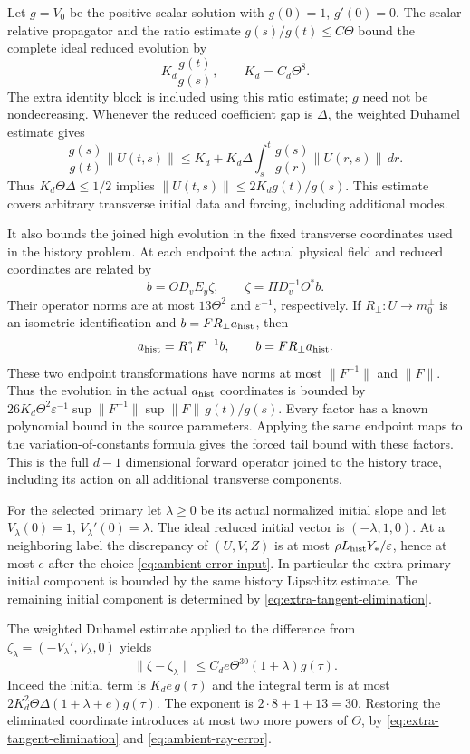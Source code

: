 \documentclass[11pt]{article}
\theoremstyle{definition}
\begin{document}
Let $g=V_0$ be the positive scalar solution with $g(0)=1$, $g'(0)=0$.
The scalar relative propagator and the ratio estimate
$g(s)/g(t)\leq C\Theta$ bound the complete ideal reduced evolution by
\[
 K_d\frac{g(t)}{g(s)},\qquad K_d=C_d\Theta^8 .
\]
The extra identity block is included using this ratio estimate;
$g$ need not be nondecreasing. Whenever the reduced
coefficient gap is $\Delta$, the weighted Duhamel estimate gives
\[
 \frac{g(s)}{g(t)}\|U(t,s)\|
 \leq K_d+K_d\Delta
       \int_s^t\frac{g(s)}{g(r)}\|U(r,s)\|\,dr .
\]
Thus $K_d\Theta\Delta\leq1/2$ implies
$\|U(t,s)\|\leq2K_dg(t)/g(s)$.
This estimate covers arbitrary transverse initial data and forcing,
including additional modes.

It also bounds the joined high evolution in the fixed transverse
coordinates used in the history problem. At each endpoint the actual
physical field and reduced coordinates are related by
\[
 b=O D_vE_y\zeta,\qquad
 \zeta=\Pi D_v^{-1}O^*b.
\]
Their operator norms are at most $13\Theta^2$ and
$\varepsilon^{-1}$, respectively. If $R_\perp:U\to m_0^\perp$
is an isometric identification and $b=F R_\perp a_{\rm hist}$, then
\[
 a_{\rm hist}=R_\perp^*F^{-1}b,\qquad
 b=F R_\perp a_{\rm hist}.
\]
These two endpoint transformations have norms at most $\|F^{-1}\|$ and $\|F\|$.
Thus the evolution in the actual $a_{\rm hist}$ coordinates is bounded
by $26K_d\Theta^2\varepsilon^{-1}
\sup\|F^{-1}\|\sup\|F\|\,g(t)/g(s)$.
Every factor has a known polynomial bound in the source parameters.
Applying the same endpoint maps to the variation-of-constants formula gives the forced
tail bound with these factors. This is the full $d-1$ dimensional
forward operator joined to the history trace, including its action
on all additional transverse components.

For the selected primary let $\lambda\geq0$ be its actual normalized
initial slope and let $V_\lambda(0)=1$, $V_\lambda'(0)=\lambda$.
The ideal reduced initial vector is $(-\lambda,1,0)$.
At a neighboring label the discrepancy of $(U,V,Z)$ is at most
$\rho L_{\rm hist}Y_*/\varepsilon$, hence at most $e$ after the choice
\eqref{eq:ambient-error-input}. In particular the extra primary
initial component is bounded by the same history Lipschitz estimate. The remaining initial component is
determined by \eqref{eq:extra-tangent-elimination}.

The weighted Duhamel estimate applied to the difference from
$\zeta_\lambda=(-V_\lambda',V_\lambda,0)$ yields
\begin{equation}\label{eq:ambient-primary-relative}
 \|\zeta-\zeta_\lambda\|
 \leq C_de\Theta^{30}(1+\lambda)g(\tau).
\end{equation}
Indeed the initial term is $K_de\,g(\tau)$ and the integral term is
at most $2K_d^2\Theta\Delta(1+\lambda+e)g(\tau)$.
The exponent is $2\cdot8+1+13=30$.
Restoring the eliminated coordinate introduces at most two more powers
of $\Theta$, by \eqref{eq:extra-tangent-elimination} and
\eqref{eq:ambient-ray-error}.
\end{document}

